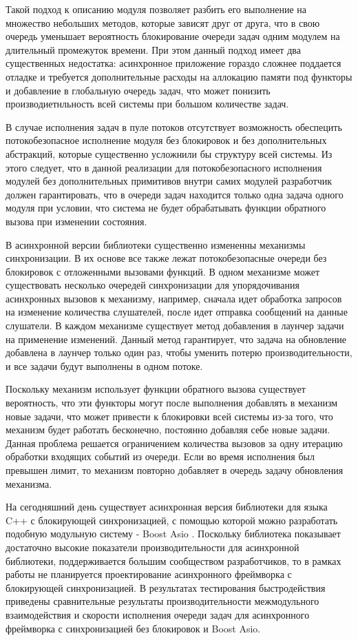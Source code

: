 Такой подход к описанию модуля позволяет разбить его выполнение на множество небольших методов, которые зависят друг от друга, что в свою очередь уменьшает вероятность блокирование очереди задач одним модулем на длительный промежуток времени. При этом данный подход имеет два существенных недостатка: асинхронное приложение гораздо сложнее поддается отладке и требуется дополнительные расходы на аллокацию памяти под функторы и добавление в глобальную очередь задач, что может понизить производиетнльность всей системы при большом количестве задач.

В случае исполнения задач в пуле потоков отсутствует возможность обеспецить потокобезопасное исполнение модуля без блокировок и без дополнительных абстракций, которые существенно усложнили бы структуру всей системы. Из этого следует, что в данной реализации для потокобезопасного исполнения модулей без дополнительных примитивов внутри самих модулей разработчик должен гарантировать, что в очереди задач находится только одна задача одного модуля при условии, что система не будет обрабатывать функции обратного вызова при изменении состояния.

В асинхронной версии библиотеки существенно измененны механизмы синхронизации. В их основе все также лежат потокобезопасные очереди без блокировок с отложенными вызовами функций. В одном механизме может существовать несколько очередей синхронизации для упорядочивания асинхронных вызовов к механизму, например, сначала идет обработка запросов на изменение количества слушателей, после идет отправка сообщений на данные слушатели. В каждом механизме существует метод добавления в лаунчер задачи на применение изменений. Данный метод гарантирует, что задача на обновление добавлена в лаунчер только один раз, чтобы уменить потерю производительности, и все задачи будут выполнены в одном потоке.

Поскольку механизм использует функции обратного вызова существует вероятность, что эти функторы могут после выполнения добавлять в механизм новые задачи, что может привести к блокировки всей системы из-за того, что механизм будет работать бесконечно, постоянно добавляя себе новые задачи. Данная проблема решается ограничением количества вызовов за одну итерацию обработки входящих событий из очереди. Если во время исполнения был превышен лимит, то механизм повторно добавляет в очередь задачу обновления механизма.

На сегодняшний день существует асинхронная версия библиотеки для языка C++ с блокирующей синхронизацией, с помощью которой можно разработать подобную модульную систему - Boost Asio \cite{torjo2013boost}. Поскольку библиотека показывает достаточно высокие показатели производительности для асинхронной библиотеки, поддерживается большим сообществом разработчиков, то в рамках работы не планируется проектирование асинхронного фреймворка с блокирующей синхронизацией. В результатах тестирования быстродействия приведены сравнительные результаты производительности межмодульного взаимодействия и скорости исполнения очереди задач для асинхронного фреймворка с синхронизацией без блокировок и Boost Asio.






